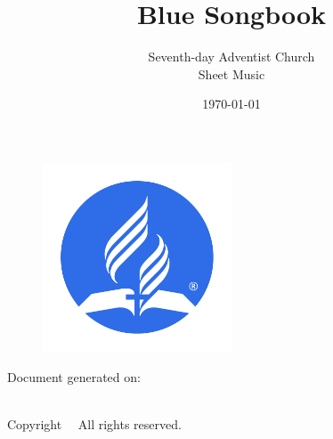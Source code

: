 \documentclass[12pt,a5paper,twoside]{article}
\begin{document}
\begin{titlepage}
\title{{\textbf{\Huge Blue Songbook}}}
\author{Seventh-day Adventist Church \\ Sheet Music}
\date{}
\maketitle
\begin{center}
\begin{figure}[htb]
        \center
        \includegraphics[width=0.5\textwidth]{Cover/adventist-symbol-circle--bluejay.png}
\end{figure}
\thispagestyle{empty} %
\vspace*{\fill}

Document generated on: \date{\today} \\
Copyright \textcopyright\ \the\year\ All rights reserved.
\end{center}
\end{titlepage}
\end{document}
